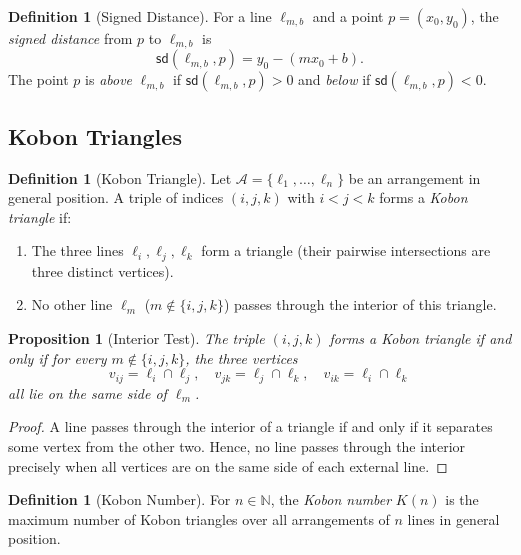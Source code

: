 \documentclass[11pt,a4paper]{article}
\theoremstyle{plain}
\newtheorem{proposition}[theorem]{Proposition}
\theoremstyle{definition}
\newtheorem{definition}[theorem]{Definition}
\theoremstyle{remark}
\newcommand{\K}{K}
\newcommand{\N}{\mathbb{N}}
\begin{document}
\begin{definition}[Signed Distance]
For a line $\ell_{m,b}$ and a point $p = (x_0, y_0)$, the \emph{signed distance} from $p$ to $\ell_{m,b}$ is
\[
\mathsf{sd}(\ell_{m,b}, p) = y_0 - (mx_0 + b).
\]
The point $p$ is \emph{above} $\ell_{m,b}$ if $\mathsf{sd}(\ell_{m,b}, p) > 0$ and \emph{below} if $\mathsf{sd}(\ell_{m,b}, p) < 0$.
\end{definition}

\subsection{Kobon Triangles}

\begin{definition}[Kobon Triangle]
\label{def:kobon}
Let $\mathcal{A} = \{\ell_1, \ldots, \ell_n\}$ be an arrangement in general position. A triple of indices $(i,j,k)$ with $i < j < k$ forms a \emph{Kobon triangle} if:
\begin{enumerate}[label=(\roman*)]
\item The three lines $\ell_i, \ell_j, \ell_k$ form a triangle (their pairwise intersections are three distinct vertices).
\item No other line $\ell_m$ ($m \notin \{i,j,k\}$) passes through the interior of this triangle.
\end{enumerate}
\end{definition}

\begin{proposition}[Interior Test]
\label{prop:interior-test}
The triple $(i,j,k)$ forms a Kobon triangle if and only if for every $m \notin \{i,j,k\}$, the three vertices
\[
v_{ij} = \ell_i \cap \ell_j, \quad v_{jk} = \ell_j \cap \ell_k, \quad v_{ik} = \ell_i \cap \ell_k
\]
all lie on the same side of $\ell_m$.
\end{proposition}

\begin{proof}
A line passes through the interior of a triangle if and only if it separates some vertex from the other two. Hence, no line passes through the interior precisely when all vertices are on the same side of each external line.
\end{proof}

\begin{definition}[Kobon Number]
For $n \in \N$, the \emph{Kobon number} $\K(n)$ is the maximum number of Kobon triangles over all arrangements of $n$ lines in general position.
\end{definition}
\end{document}
